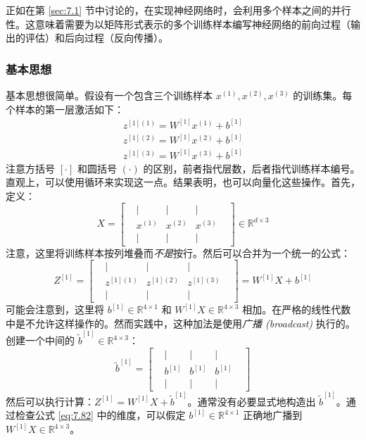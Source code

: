 正如在第 \ref{sec:7.1} 节中讨论的，在实现神经网络时，会利用多个样本之间的并行性。这意味着需要为以矩阵形式表示的多个训练样本编写神经网络的前向过程（输出的评估）和后向过程（反向传播）。

\subsubsection*{基本思想} 

基本思想很简单。假设有一个包含三个训练样本 $x^{(1)}, x^{(2)}, x^{(3)}$ 的训练集。每个样本的第一层激活如下：
\begin{align*}
    z^{[1](1)} = W^{[1]}x^{(1)} + b^{[1]} \\
    z^{[1](2)} = W^{[1]}x^{(2)} + b^{[1]} \\
    z^{[1](3)} = W^{[1]}x^{(3)} + b^{[1]}
\end{align*}
注意方括号 $[ \cdot ]$ 和圆括号 $( \cdot )$ 的区别，前者指代层数，后者指代训练样本编号。直观上，可以使用循环来实现这一点。结果表明，也可以向量化这些操作。首先，定义：
\begin{equation}
    X = \begin{bmatrix}
        &|&|&|& \\
        &x^{(1)}&x^{(2)}&x^{(3)}& \\
        &|&|&|&
    \end{bmatrix} \in \mathbb{R}^{d \times 3} \label{eq:7.81}
\end{equation}
注意，这里将训练样本按列堆叠而\textit{不是}按行。然后可以合并为一个统一的公式：
\begin{equation}
    Z^{[1]} = \begin{bmatrix}
        &|&|&|& \\
        &z^{[1](1)}&z^{[1](2)}&z^{[1](3)}& \\
        &|&|&|&
    \end{bmatrix} = W^{[1]}X + b^{[1]} \label{eq:7.82}
\end{equation}
可能会注意到，这里将 $b^{[1]} \in \mathbb{R}^{4 \times 1}$ 和 $W^{[1]}X \in \mathbb{R}^{4 \times 3}$ 相加。在严格的线性代数中是不允许这样操作的。然而实践中，这种加法是使用\textit{广播 (broadcast)} 执行的。创建一个中间的 $\tilde{b}^{[1]} \in \mathbb{R}^{4 \times 3}$：
\begin{equation}
    \tilde{b}^{[1]} = \begin{bmatrix}
        &|&|&|& \\
        &b^{[1]}&b^{[1]}&b^{[1]}& \\
        &|&|&|&
    \end{bmatrix} \label{eq:7.83}
\end{equation}
然后可以执行计算：$Z^{[1]} = W^{[1]}X + \tilde{b}^{[1]}$。通常没有必要显式地构造出 $\tilde{b}^{[1]}$。通过检查公式 \eqref{eq:7.82} 中的维度，可以假定 $b^{[1]} \in \mathbb{R}^{4 \times 1}$ 正确地广播到 $W^{[1]}X \in \mathbb{R}^{4 \times 3}$。

